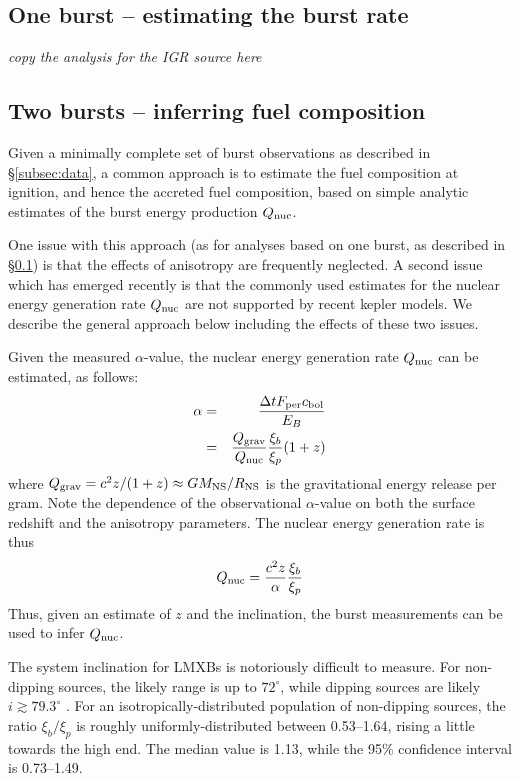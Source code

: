 \documentclass{aastex61}
\begin{document}
\subsection{One burst -- estimating the burst rate} 
\label{subsec:burstrate}

{\it copy the analysis for the IGR source here }

\subsection{Two bursts -- inferring fuel composition} 
\label{subsec:fuelcomp}

Given a minimally complete set of burst observations as described in \S\ref{subsec:data}, a common approach \cite[e.g][]{falanga11} is to estimate the fuel composition at ignition, and hence the accreted fuel composition, based on simple analytic estimates of the burst energy production $Q_{\rm nuc}$.

One issue with this approach (as for analyses based on one burst, as described in \S\ref{subsec:burstrate}) is that the effects of anisotropy are frequently neglected.
%
A second issue which has emerged recently is that the commonly used estimates for the nuclear energy generation rate $Q_{\rm nuc}$ are not supported by recent {\sc kepler} models. 
%
We describe the general approach below including the effects of these two issues.

Given the measured $\alpha$-value, the nuclear energy generation rate $Q_{\rm nuc}$ can be estimated, as follows:
\begin{eqnarray}
\alpha & = & \frac{\Delta t F_{\rm per} c_{\rm bol}}{E_B} \\
& = & \frac{Q_{\rm grav}}{Q_{\rm nuc}}\frac{\xi_b}{\xi_p}(1+z)
\end{eqnarray}
where $Q_{\rm grav} = c^2z/(1+z) \approx GM_{\rm NS}/R_{\rm NS}$ is the gravitational energy release per gram. Note the dependence of the observational $\alpha$-value on both the surface redshift and the anisotropy parameters. The nuclear energy generation rate is thus
\begin{equation}
Q_{\rm nuc} = \frac{c^2 z}{\alpha}\frac{\xi_b}{\xi_p} \label{qnuc}
\end{equation}
Thus, given an estimate of $z$ and the inclination, the burst measurements can be used to infer $Q_{\rm nuc}$. 

The system inclination for LMXBs is notoriously difficult to measure. For non-dipping sources, the likely range is up to $72^\circ$, while dipping sources are likely $i\gtrsim79.3^\circ$ \cite[]{gal16a}.
% 
For an isotropically-distributed population of non-dipping sources, the ratio $\xi_b/\xi_p$ is roughly uniformly-distributed between 0.53--1.64, rising a little towards the high end. The median value is 1.13, while the 95\% confidence interval is 0.73--1.49.
\end{document}
